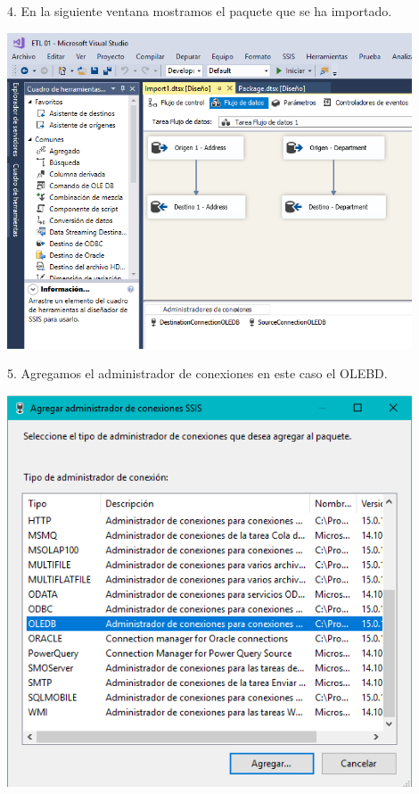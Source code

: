 4. En la siguiente ventana mostramos el paquete que se ha importado.\\
	\begin{center}
	\includegraphics[width=12cm]{./Imagenes/img17}
	\end{center}	
5. Agregamos el administrador de conexiones en este caso el OLEBD. \\
	\begin{center}
	\includegraphics[width=12cm]{./Imagenes/img18}
	\end{center}	

